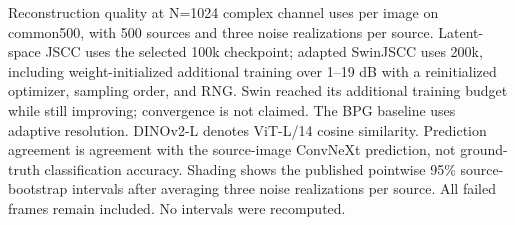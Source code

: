 Reconstruction quality at N=1024 complex channel uses per image on common500, with 500 sources and three noise realizations per source. Latent-space JSCC uses the selected 100k checkpoint; adapted SwinJSCC uses 200k, including weight-initialized additional training over 1--19 dB with a reinitialized optimizer, sampling order, and RNG. Swin reached its additional training budget while still improving; convergence is not claimed. The BPG baseline uses adaptive resolution. DINOv2-L denotes ViT-L/14 cosine similarity. Prediction agreement is agreement with the source-image ConvNeXt prediction, not ground-truth classification accuracy. Shading shows the published pointwise 95\% source-bootstrap intervals after averaging three noise realizations per source. All failed frames remain included. No intervals were recomputed.
